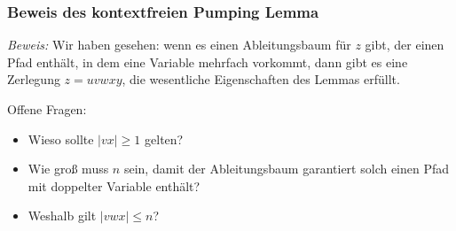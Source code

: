 \documentclass[aspectratio=1610,onlymath]{beamer}
\begin{document}
\begin{frame}[t]\frametitle{Beweis des kontextfreien Pumping Lemma}

\vspace{-1ex}
\medskip

\emph{Beweis:} Wir haben gesehen: wenn es einen Ableitungsbaum für $z$ gibt, der einen Pfad
enthält, in dem eine Variable  mehrfach vorkommt, dann gibt es eine Zerlegung
$z=uvwxy$, die wesentliche Eigenschaften des Lemmas erfüllt.
\medskip\pause

Offene Fragen:
\begin{itemize}
\item Wieso sollte $|vx|\geq 1$ gelten?
\item Wie groß muss $n$ sein, damit der Ableitungsbaum garantiert solch einen Pfad mit doppelter Variable enthält?
\item Weshalb gilt $|vwx|\leq n$?
\end{itemize}\pause


\end{frame}
\end{document}
